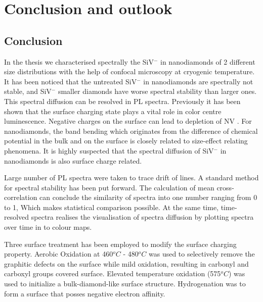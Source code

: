 \chapter{Conclusion and outlook} %

\label{Chapter3} %

\section{Conclusion}

In the thesis we characterised spectrally the SiV$^{-}$ in nanodiamonds of 2 different size distributions with the help of confocal microscopy at cryogenic temperature. It has been noticed that the untreated SiV$^{-}$ in nanodiamonds are spectrally not stable, and SiV$^{-}$ smaller diamonds have worse spectral stability than larger ones. This spectral diffusion can be resolved in PL spectra. Previously it has been shown that the surface charging state plays a vital role in color centre luminescence. Negative charges on the surface can lead to depletion of NV \citep{stacey_depletion_2012}. For nanodiamonds, the band bending which originates from the difference of chemical potential in the bulk and on the surface is closely related to size-effect relating phenomena. It is highly suspected that the spectral diffusion of SiV$^{-}$ in nanodiamonds is also surface charge related.

Large number of PL spectra were taken to trace drift of lines. A standard method for spectral stability has been put forward. The calculation of mean cross-correlation can conclude the similarity of spectra into one number ranging from 0 to 1, Which makes statistical comparison possible. At the same time, time-resolved spectra realises the visualisation of spectra diffusion by plotting spectra over time in to colour maps.

Three surface treatment has been employed to modify the surface charging property. Aerobic Oxidation at 460$^{o}C$ - 480$^{o}C$ was used to selectively remove the graphitic defects on the surface while mild oxidation, resulting in carbonyl and carboxyl groups covered surface. Elevated temperature oxidation (575$^{o}C$) was used to initialize a bulk-diamond-like surface structure. Hydrogenation was to form a surface that posses negative electron affinity.

